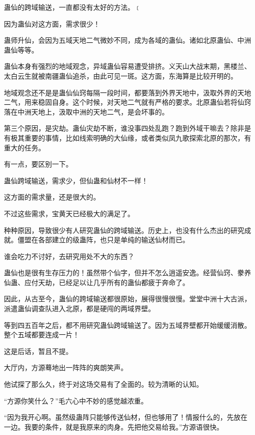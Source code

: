 
\begin{this_body}

蛊仙的跨域输送，一直都没有太好的方法。﹝

因为蛊仙对这方面，需求很少！

蛊师升仙，会因为五域天地二气微妙不同，成为各域的蛊仙。诸如北原蛊仙、中洲蛊仙等等。

蛊仙本身有强烈的地域观念，异域蛊仙容易遭受排挤。义天山大战末期，黑楼兰、太白云生就被南疆蛊仙追杀，由此可见一斑。这方面，东海算是比较开明的。

地域观念还不是是蛊仙仙窍每隔一段时间，都要落到外界天地中，汲取外界的天地二气，用来稳固自身。这个时候，对天地二气就有严格的要求。北原蛊仙若将仙窍落在中洲天地上，汲取中洲的天地二气，是会坏事的。

第三个原因，是灾劫。蛊仙灾劫不断，谁没事四处乱跑？跑到外域干嘛去？除非是有极其重要的事情，比如线索明确的大仙缘，或者类似凤九歌探索北原的那次，有重大的任务。

有一点，要区别一下。

蛊仙跨域输送，需求少，但仙蛊和仙材不一样！

这方面的需求量，还是很大的。

不过这些需求，宝黄天已经极大的满足了。

种种原因，导致很少有人研究蛊仙的跨域输送。历史上，也没有什么杰出的研究成就。僵盟在各部建立的级蛊阵，也只是单纯的输送仙材而已。

谁会吃力不讨好，去研究用处不大的东西？

蛊仙也是很有生存压力的！虽然带个仙字，但并不怎么逍遥安逸。经营仙窍、豢养仙蛊、应付天劫，已经足以让几乎所有的蛊仙都疲于奔命了。

因此，从古至今，蛊仙的跨域输送都很原始，展得很慢很慢。堂堂中洲十大古派，派遣蛊仙调查队进入北原，都是硬闯的两域界壁。

等到四五百年之后，都不用研究蛊仙跨域输送了。因为五域界壁都开始缓缓消散。整个五域都要连成一片！

这是后话，暂且不提。

大厅内，方源蓦地出一阵阵的爽朗笑声。

他试探了那么久，终于对这场交易有了全面的。较为清晰的认知。

“方源你笑什么？”毛六心中不妙的感觉越浓重。

“因为我开心啊。虽然级蛊阵只能够传送仙材，但也够用了！情报什么的，先放在一边。我要的条件，就是我原来的肉身。先把他交易给我。”方源语很快。


\end{this_body}
